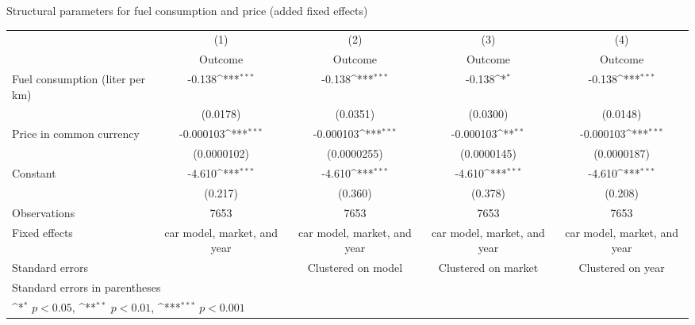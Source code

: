 {
\def\sym#1{\ifmmode^{#1}\else\(^{#1}\)\fi}
\caption{Structural parameters for fuel consumption and price (added fixed effects) \label{tab:2}}
\begin{tabular*}{\textwidth}{@{\hskip\tabcolsep\extracolsep\fill}l*{4}{c}}
\toprule
                    &\multicolumn{1}{c}{(1)}&\multicolumn{1}{c}{(2)}&\multicolumn{1}{c}{(3)}&\multicolumn{1}{c}{(4)}\\
                    &\multicolumn{1}{c}{Outcome}&\multicolumn{1}{c}{Outcome}&\multicolumn{1}{c}{Outcome}&\multicolumn{1}{c}{Outcome}\\
\midrule
Fuel consumption (liter per km)&      -0.138\sym{***}&      -0.138\sym{***}&      -0.138\sym{*}  &      -0.138\sym{***}\\
                    &    (0.0178)         &    (0.0351)         &    (0.0300)         &    (0.0148)         \\
\addlinespace
Price in common currency&   -0.000103\sym{***}&   -0.000103\sym{***}&   -0.000103\sym{**} &   -0.000103\sym{***}\\
                    & (0.0000102)         & (0.0000255)         & (0.0000145)         & (0.0000187)         \\
\addlinespace
Constant            &      -4.610\sym{***}&      -4.610\sym{***}&      -4.610\sym{***}&      -4.610\sym{***}\\
                    &     (0.217)         &     (0.360)         &     (0.378)         &     (0.208)         \\
\midrule
Observations        &        7653         &        7653         &        7653         &        7653         \\
Fixed effects       &car model, market, and year         &car model, market, and year         &car model, market, and year         &car model, market, and year         \\
Standard errors     &                     &Clustered on model         &Clustered on market         &Clustered on year         \\
\bottomrule
\multicolumn{5}{l}{\footnotesize Standard errors in parentheses}\\
\multicolumn{5}{l}{\footnotesize \sym{*} \(p<0.05\), \sym{**} \(p<0.01\), \sym{***} \(p<0.001\)}\\
\end{tabular*}
}
